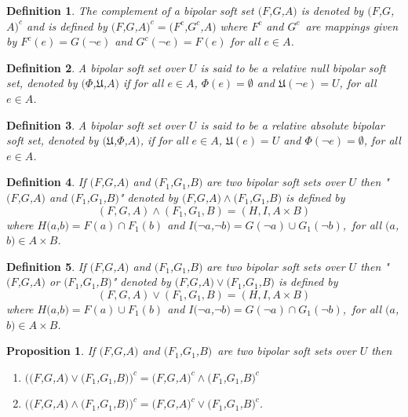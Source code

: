 \documentclass{amsart}
\theoremstyle{plain}
\newtheorem{definition}{Definition}
\newtheorem{proposition}{Proposition}
\numberwithin{equation}{section}
\begin{document}
\begin{definition}
The \textit{complement of a bipolar soft set} $(F$,$G$,$A)$ is denoted by $(F $,$G$,$A)^{c}$ and is defined by $(F$,$G$,$A)^{c}=(F^{c}$,$G^{c}$,$A)$
where $F^{c}$ and $G^{c}$\ are mappings given by $F^{c}(e)=G(\lnot e)$ and $G^{c}(\lnot e)=F(e)$ for all $e\in A$.
\end{definition}

\begin{definition}
A \textit{bipolar} soft set over $U$ is said to be a \textit{relative null
bipolar soft set,} denoted by $(\Phi $,$\mathfrak{U}$,$A)$ if for all $e\in
A $, $\Phi (e)=\emptyset $ and $\mathfrak{U}(\lnot e)=U$, for all $e\in A$.
\end{definition}

\begin{definition}
A \textit{bipolar} soft set over $U$ is said to be a \textit{relative
absolute bipolar soft set,} denoted by $(\mathfrak{U}$,$\Phi $,$A)$, if for
all $e\in A$, $\mathfrak{U}(e)=U$ and $\Phi (\lnot e)=\emptyset $, for all $e\in A$.
\end{definition}

\begin{definition}
If $(F$,$G$,$A)$ and $(F_{1}$,$G_{1}$,$B)$ are two \textit{bipolar} soft
sets over $U$ then " $(F$,$G$,$A)$ and $(F_{1}$,$G_{1}$,$B)$" denoted by $(F$,$G$,$A)\wedge (F_{1}$,$G_{1}$,$B)$ is defined by\begin{equation*}
(F,G,A)\wedge (F_{1},G_{1},B)=(H,I,A\times B)
\end{equation*}where $H(a$,$b)=F(a)\cap F_{1}(b)$ and $I(\lnot a$,$\lnot b)=G(\lnot a)\cup
G_{1}(\lnot b)$,\ for all $(a$,$b)\in A\times B$.
\end{definition}

\begin{definition}
If $(F$,$G$,$A)$ and $(F_{1}$,$G_{1}$,$B)$ are two \textit{bipolar} soft
sets over $U$ then " $(F$,$G$,$A)$ or $(F_{1}$,$G_{1}$,$B)$" denoted by $(F$,$G$,$A)\vee (F_{1}$,$G_{1}$,$B)$ is defined by\begin{equation*}
(F,G,A)\vee (F_{1},G_{1},B)=(H,I,A\times B)
\end{equation*}where $H(a$,$b)=F(a)\cup F_{1}(b)$ and $I(\lnot a$,$\lnot b)=G(\lnot a)\cap
G_{1}(\lnot b)$,\ for all $(a$,$b)\in A\times B$.
\end{definition}

\begin{proposition}
If $(F$,$G$,$A)$ and $(F_{1}$,$G_{1}$,$B)$\ are two \textit{bipolar} soft
sets over $U$ then

\begin{enumerate}
\item $((F$,$G$,$A)\vee (F_{1}$,$G_{1}$,$B))^{c}=(F$,$G$,$A)^{c}\wedge
(F_{1} $,$G_{1}$,$B)^{c}$

\item $((F$,$G$,$A)\wedge (F_{1}$,$G_{1}$,$B))^{c}=(F$,$G$,$A)^{c}\vee
(F_{1} $,$G_{1}$,$B)^{c}$.
\end{enumerate}
\end{proposition}
\end{document}

